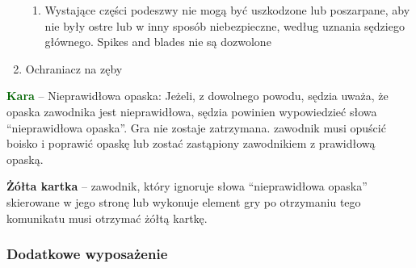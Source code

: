 \documentclass[12pt]{article}
\newcommand\yellowcard[1]{\bgroup\textcolor{darkyellow}{\textbf{#1}}}
\newcommand\other[1]{\bgroup\textcolor{darkgreen}{\textbf{#1}}}
\begin{document}
\begin{enumerate}
	      \begin{enumerate}
		      \item
		            Wystające części podeszwy nie mogą być uszkodzone lub poszarpane,
		            aby nie były ostre lub w inny sposób niebezpieczne, według uznania
		            sędziego głównego. Spikes and blades nie są dozwolone
	      \end{enumerate}
	\item
	      Ochraniacz na zęby
\end{enumerate}

\other{Kara} -- Nieprawidłowa opaska: Jeżeli, z dowolnego powodu, sędzia
uważa, że opaska zawodnika jest nieprawidłowa, sędzia powinien
wypowiedzieć słowa ``nieprawidłowa opaska''. Gra nie zostaje zatrzymana.
zawodnik musi opuścić boisko i poprawić opaskę lub zostać zastąpiony
zawodnikiem z prawidłową opaską.

\yellowcard{Żółta kartka} -- zawodnik, który ignoruje słowa ``nieprawidłowa
opaska'' skierowane w jego stronę lub wykonuje element gry po otrzymaniu
tego komunikatu musi otrzymać żółtą kartkę.

\subsubsection{Dodatkowe wyposażenie}
\end{document}
